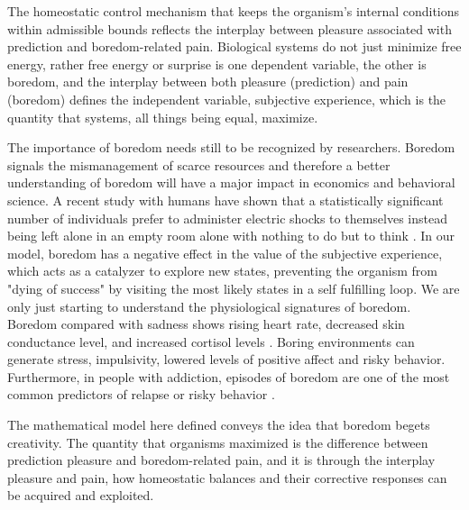 \documentclass[11pt, onecolumn]{article}
\newcommand{\myreferences}{C:/workspace/github/bibliography-jgr/bibliojgr}
\begin{document}
The homeostatic control mechanism that keeps the organism's internal conditions within admissible bounds reflects the interplay between pleasure associated with prediction and boredom-related pain.
Biological systems do not just minimize free energy, rather free energy or surprise is one dependent variable, the other is boredom, and the interplay between both pleasure (prediction) and pain (boredom) defines the independent variable, subjective experience, which is the quantity that systems, all things being equal, maximize. 

The importance of boredom needs still to be recognized by researchers. Boredom signals the mismanagement of scarce resources and therefore a better  understanding of boredom will have a major impact in economics and behavioral science. A recent study with humans have shown that a statistically significant number of individuals prefer to administer electric shocks to themselves instead being left alone in an empty room alone with nothing to do but to think \citep{wilson_just_2014}. In our model, boredom has a negative effect in the value of the subjective experience, which acts as a catalyzer to explore new states, preventing the organism from "dying of success" by visiting the most likely states  in a self fulfilling loop. We are only just starting to understand the physiological signatures of boredom. Boredom compared with sadness shows rising heart rate, decreased skin conductance level, and increased cortisol levels \citep{merrifield_characterizing_2014}. Boring environments can generate stress, impulsivity, lowered levels of positive affect and risky behavior. Furthermore, in people with addiction, episodes of  boredom are one of the most common predictors of relapse or risky behavior \citep{blaszczynski_boredom_1990}.

The mathematical model here defined conveys the idea that boredom begets creativity. The quantity that organisms maximized is the difference between prediction pleasure and boredom-related pain, and it is  through the interplay pleasure and pain, how homeostatic balances and their corrective responses can be acquired and exploited.


%



\end{document}
